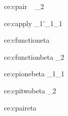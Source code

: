 \documentclass{article}
\theoremstyle{break}
\begin{document}
  {ce:cpair}
  {\qquad\   \qquad
       {\kind_2}}
  {\equivconstructor{\context}
     {}
     {}
     {}}

  {ce:capply}
  {
                    {}\qquad
   \equivconstructor{\context}
                    {\constructor_1}{\constructor'_1}{\kind_1}}
  {\equivconstructor{\context}
     {}
     {}
     {}}

  {ce:cfunctioneta}
  {\validconstructor{\context}{\constructor}
     {}}
  {\equivconstructor{\context}
     {}
     {\constructor}{}}

  {ce:cfunctionbeta}
  {\validconstructor{\context}
     {}
     {}\qquad
   }
  {\equivconstructor{\context}
     {
             {\constructor_2}}
     {}
     {}}

  {ce:cpionebeta}
  {
     {}}
  {\equivconstructor{\context}
     {}
     {\constructor_1}{\kind_1}}

  {ce:cpitwobeta}
  {\qquad
     {}}
  {\equivconstructor{\context}
     {}
     {\constructor_2}{}}

  {ce:cpaireta}
  {}
  {\equivconstructor{\context}
     {\constructor}
     {}
     {}}
\end{document}
